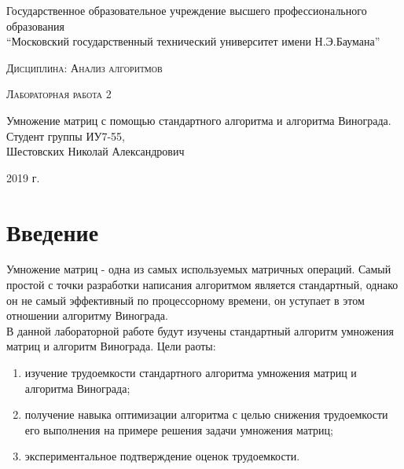 \documentclass[a4paper, 14pt]{article}
\begin{document}
    \begin{titlepage}

        \begin{center}
            \large
            Государственное образовательное учреждение высшего профессионального образования\\
            “Московский государственный технический университет имени Н.Э.Баумана”
            \vspace{3cm}
            
            \textsc{Дисциплина: Анализ алгоритмов}
            \vspace{0.5cm}
                
            \textsc{Лабораторная работа 2}
            \vspace{1.5cm}
            
            {\LARGE Умножение матриц с помощью стандартного алгоритма и алгоритма Винограда.\\}
            \vspace{1.5cm}
            Студент группы ИУ7-55,\\   
            Шестовских Николай Александрович
            \vfill
            
            2019 г.
            
            \end{center}

    \end{titlepage}
    \setcounter{page}{2}
\tableofcontents
	
	\newpage
	
        \section*{Введение}
        
        
        \parindent=1cm
        Умножение матриц - одна из самых используемых матричных операций. Самый простой с точки разработки написания алгоритмом является стандартный, однако он не самый  эффективный по процессорному времени, он уступает в этом отношении алгоритму Винограда.\\
		В данной лабораторной работе будут изучены стандартный алгоритм умножения матриц и алгоритм Винограда.
        Цели раоты:
		\begin{enumerate}
		\item изучение трудоемкости стандартного алгоритма умножения матриц и алгоритма Винограда;
		\item получение навыка оптимизации алгоритма с целью снижения трудоемкости его выполнения на примере решения задачи умножения матриц;
		\item экспериментальное подтверждение оценок трудоемкости.
		\end{enumerate}
        
\end{document}
